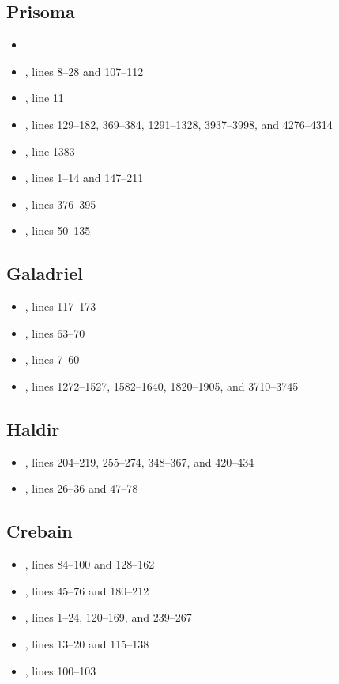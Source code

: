 \documentclass[11pt]{article}
\begin{document}
\subsection{Prisoma}
\begin{itemize}
\item {}
\item {}, lines 8--28 and 107--112
\item {}, line 11
\item {}, lines 129--182, 369--384, 1291--1328, 3937--3998, and 4276--4314
\item {}, line 1383
\item {}, lines 1--14 and 147--211
\item {}, lines 376--395
\item {}, lines 50--135
\end{itemize}

\subsection{Galadriel}
\begin{itemize}
\item {}, lines 117--173
\item {}, lines 63--70
\item {}, lines 7--60
\item {}, lines 1272--1527, 1582--1640, 1820--1905, and 3710--3745
\end{itemize}

\subsection{Haldir}
\begin{itemize}
\item {}, lines 204--219, 255--274, 348--367, and 420--434
\item {}, lines 26--36 and 47--78
\end{itemize}

\subsection{Crebain}
\begin{itemize}
\item {}, lines 84--100 and 128--162
\item {}, lines 45--76 and 180--212
\item {}, lines 1--24, 120--169, and 239--267
\item {}, lines 13--20 and 115--138
\item {}, lines 100--103
\end{itemize}
\end{document}
